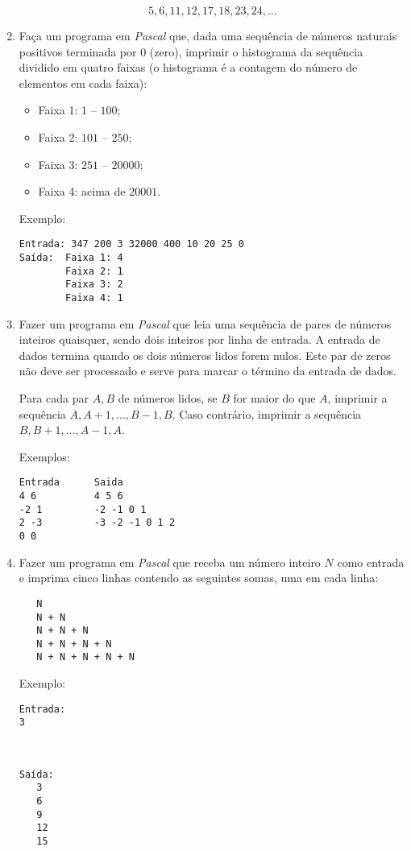 \begin{enumerate}
\[ 5,6,11,12,17,18,23,24, \ldots\]


\item Faça um programa em \emph{Pascal} que, dada uma sequência de números naturais positivos terminada por $0$ (zero), imprimir o histograma da sequência dividido em quatro faixas (o histograma é a contagem do número de elementos em cada faixa):
\begin{itemize}
 \item Faixa 1: $1$ -- $100$;
 \item Faixa 2: $101$ -- $250$;
 \item Faixa 3: $251$ -- $20000$;
 \item Faixa 4: acima de $20001$.
\end{itemize}

Exemplo:
\begin{verbatim}
Entrada: 347 200 3 32000 400 10 20 25 0
Saída:  Faixa 1: 4
        Faixa 2: 1
        Faixa 3: 2
        Faixa 4: 1
\end{verbatim}


\item Fazer um programa em \emph{Pascal} que leia uma sequência de
 pares de números inteiros quaisquer, sendo dois inteiros por linha de
entrada. A entrada de dados termina quando os dois números lidos forem nulos.
Este par de zeros não deve ser processado e serve para marcar o
término da entrada de dados.

Para cada par $A,B$ de números lidos, se $B$ for maior do que
$A$, imprimir a sequência $A,A+1, \ldots, B-1,B$. Caso contrário,
imprimir a sequência $B,B+1, \ldots,A-1,A$.

Exemplos:
\begin{verbatim}
Entrada      Saida
4 6          4 5 6
-2 1         -2 -1 0 1
2 -3         -3 -2 -1 0 1 2
0 0 
\end{verbatim}


\item  Fazer um programa em \emph{Pascal} que receba um
   número inteiro $N$ como entrada e imprima cinco linhas
contendo as seguintes somas, uma em cada linha:

\begin{verbatim}
   N
   N + N
   N + N + N
   N + N + N + N
   N + N + N + N + N
\end{verbatim}

Exemplo:

\begin{minipage}{5cm}
\begin{verbatim}
Entrada:
3
\end{verbatim}
\end{minipage} \
\begin{minipage}{5cm}
\begin{verbatim}
Saída:
   3
   6
   9
   12
   15
\end{verbatim}
\end{minipage}


\end{enumerate}
